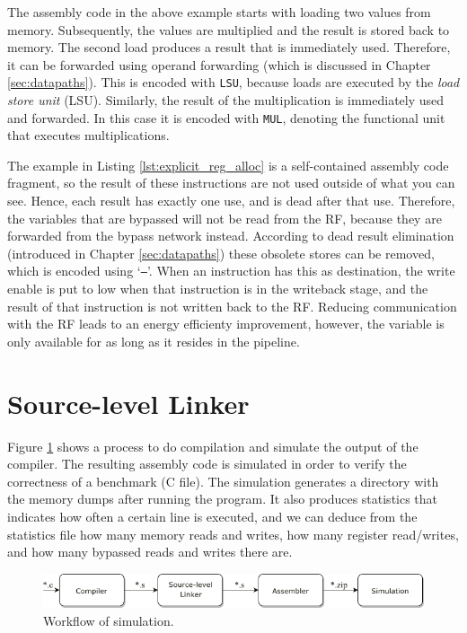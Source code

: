 The assembly code in the above example starts with loading two values from memory. Subsequently, the values are multiplied and the result is stored back to memory. The second load produces a result that is immediately used. Therefore, it can be forwarded using operand forwarding (which is discussed in Chapter \ref{sec:datapaths}). This is encoded with \texttt{LSU}, because loads are executed by the \emph{load store unit} (LSU). Similarly, the result of the multiplication is immediately used and forwarded. In this case it is encoded with \texttt{MUL}, denoting the functional unit that executes multiplications.

The example in Listing \ref{lst:explicit_reg_alloc} is a self-contained assembly code fragment, so the result of these instructions are not used outside of what you can see. Hence, each result has exactly one use, and is dead after that use. Therefore, the variables that are bypassed will not be read from the RF, because they are forwarded  from the bypass network instead. According to dead result elimination (introduced in Chapter \ref{sec:datapaths}) these obsolete stores can be removed, which is encoded using `\texttt{--}'. When an instruction has this as destination, the write enable is put to low when that instruction is in the writeback stage, and the result of that instruction is not written back to the RF. Reducing communication with the RF leads to an energy efficienty improvement, however, the variable is only available for as long as it resides in the pipeline. 

\section{Source-level Linker}
Figure \ref{fig:linker_A} shows a process to do compilation and simulate the output of the compiler. The resulting assembly code is simulated in order to verify the correctness of a benchmark (C file). The simulation generates a directory with the memory dumps after running the program. It also produces statistics that indicates how often a certain line is executed, and we can deduce from the statistics file how many memory reads and writes, how many register read/writes, and how many bypassed reads and writes there are.

\begin{figure}[H]
\centering
\includegraphics[width=.95\textwidth]{figures/linker_illustration1}
\caption{Workflow of simulation.}
\label{fig:linker_A}
\end{figure}

